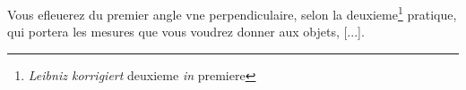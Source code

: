 \pend \pstart [p.~51] Vous efleuerez du premier angle vne perpendiculaire, selon la deuxieme\footnote{\textit{Leibniz korrigiert} deuxieme \textit{in} premiere} pratique, qui portera les mesures que vous voudrez donner aux objets, [...].